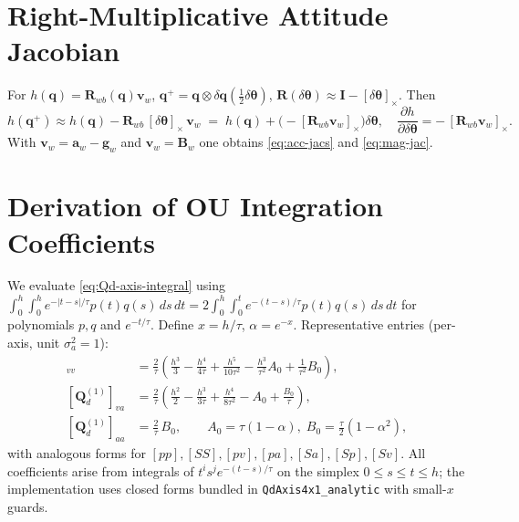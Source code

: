 \documentclass[11pt]{article}
\newcommand{\vect}[1]{\bm{#1}}
\newcommand{\mat}[1]{\bm{#1}}
\newcommand{\quat}[1]{\mathbf{#1}}
\newcommand{\I}{\mat{I}}
\newcommand{\skew}[1]{\left[ #1 \right]_\times}
\begin{document}
\section{Right-Multiplicative Attitude Jacobian}
\label{app:att-jac}
For \(h(\quat{q})=\mat{R}_{wb}(\quat{q})\vect{v}_w\),
\( \quat{q}^+=\quat{q}\otimes \delta\quat{q}(\tfrac12\delta\vect{\theta}) \),
\( \mat{R}(\delta\vect{\theta})\approx \I - \skew{\delta\vect{\theta}} \).
Then
\begin{equation}
  h(\quat{q}^+) \approx h(\quat{q}) - \mat{R}_{wb}\,\skew{\delta\vect{\theta}}\,\vect{v}_w
  \;=\; h(\quat{q}) + \bigl(-\skew{\mat{R}_{wb}\vect{v}_w}\bigr)\delta\vect{\theta},
  \quad
  \frac{\partial h}{\partial \delta\vect{\theta}} = -\,\skew{\mat{R}_{wb}\vect{v}_w}.
  \label{eq:att-jac-appendix}
\end{equation}
With \(\vect{v}_w = \vect{a}_w-\vect{g}_w\) and \(\vect{v}_w=\vect{B}_w\) one obtains
\eqref{eq:acc-jacs} and \eqref{eq:mag-jac}.

\section{Derivation of OU Integration Coefficients}
\label{app:ou-kernel}
We evaluate \eqref{eq:Qd-axis-integral} using
\(
\int_0^h\!\!\int_0^h e^{-|t-s|/\tau} p(t) q(s)\,ds\,dt
= 2\int_0^h \int_0^t e^{-(t-s)/\tau} p(t) q(s)\,ds\,dt
\)
for polynomials \(p,q\) and \(e^{-t/\tau}\).
Define \(x=h/\tau\), \(\alpha=e^{-x}\).
Representative entries (per-axis, unit \(\sigma_a^2=1\)):
\begin{align}
  [\mat{Q}_d^{(1)}]_{vv} &= \tfrac{2}{\tau}\!\left(
     \tfrac{h^3}{3} - \tfrac{h^4}{4\tau} + \tfrac{h^5}{10\tau^2}
     - \tfrac{h^3}{\tau^2}A_0 + \tfrac{1}{\tau^2}B_0
  \right), \label{eq:Qvv}\\
  [\mat{Q}_d^{(1)}]_{va} &= \tfrac{2}{\tau}\!\left(
     \tfrac{h^2}{2} - \tfrac{h^3}{3\tau} + \tfrac{h^4}{8\tau^2}
     - A_0 + \tfrac{B_0}{\tau}
  \right), \label{eq:Qva}\\
  [\mat{Q}_d^{(1)}]_{aa} &= \tfrac{2}{\tau}\, B_0,
  \qquad
  A_0=\tau(1-\alpha),\; B_0=\tfrac{\tau}{2}(1-\alpha^2),
  \label{eq:Qaa}
\end{align}
with analogous forms for \([pp], [SS], [pv], [pa], [Sa], [Sp], [Sv]\).
All coefficients arise from integrals of \(t^i s^j e^{-(t-s)/\tau}\) on the
simplex \(0\le s\le t\le h\); the implementation uses closed forms bundled
in \texttt{QdAxis4x1\_analytic} with small-\(x\) guards.
\end{document}
